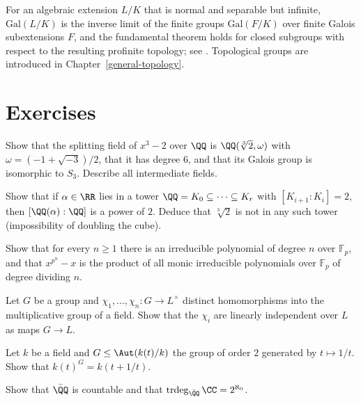 \begin{remark}\label{fields:remark-infinite-galois}
For an algebraic extension $L/K$ that is normal and separable but infinite, $\mathrm{Gal}(L/K)$ is
the inverse limit of the finite groups $\mathrm{Gal}(F/K)$ over finite Galois subextensions $F$, and the
fundamental theorem holds for closed subgroups with respect to the resulting profinite
topology; see \cite[Chapter VI, \S 14]{lang-algebra}. Topological groups are introduced in
Chapter~\ref{general-topology}.
\end{remark}

\section{Exercises}\label{fields:section-exercises}

\begin{exercise}\label{fields:exercise-splitting-x3-2}
Show that the splitting field of $x^3 - 2$ over $\QQ$ is $\QQ(\sqrt[3]{2}, \omega)$ with
$\omega = (-1 + \sqrt{-3})/2$, that it has degree $6$, and that its Galois group is isomorphic to
$S_3$. Describe all intermediate fields.
\end{exercise}

\begin{exercise}\label{fields:exercise-constructible}
Show that if $\alpha \in \RR$ lies in a tower $\QQ = K_0 \subseteq \cdots \subseteq K_r$ with $[K_{i+1} : K_i] = 2$, then
$[\QQ(\alpha) : \QQ]$ is a power of $2$. Deduce that $\sqrt[3]{2}$ is not in any such tower
(impossibility of doubling the cube).
\end{exercise}

\begin{exercise}\label{fields:exercise-irreducible-finite-field}
Show that for every $n \geq 1$ there is an irreducible polynomial of degree $n$ over $\mathbb{F}_p$, and
that $x^{p^n} - x$ is the product of all monic irreducible polynomials over $\mathbb{F}_p$ of degree
dividing $n$.
\end{exercise}

\begin{exercise}\label{fields:exercise-dedekind-independence}
Let $G$ be a group and $\chi_1, \ldots, \chi_n \colon G \to L^\times$ distinct homomorphisms into the
multiplicative group of a field. Show that the $\chi_i$ are linearly independent over $L$ as maps
$G \to L$.
\end{exercise}

\begin{exercise}\label{fields:exercise-rational-function-field}
Let $k$ be a field and $G \leq \Aut(k(t)/k)$ the group of order $2$ generated by $t \mapsto 1/t$.
Show that $k(t)^G = k(t + 1/t)$.
\end{exercise}

\begin{exercise}\label{fields:exercise-ahlfors-countable-algebraic}
Show that $\bar{\QQ}$ is countable and that $\operatorname{trdeg}_{\bar{\QQ}} \CC = 2^{\aleph_0}$.
\end{exercise}

